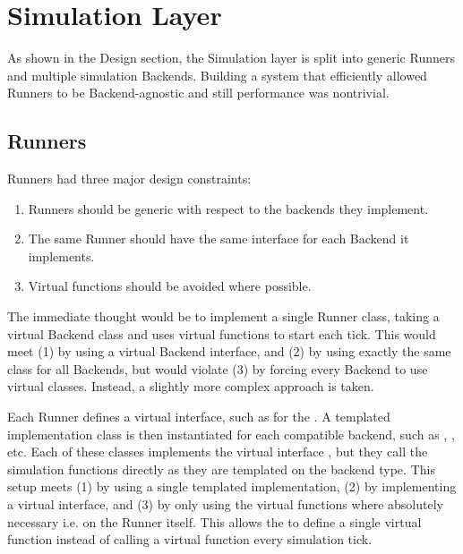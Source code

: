 \section{Simulation Layer}
As shown in the Design section, the Simulation layer is split into generic Runners and multiple simulation Backends.
Building a system that efficiently allowed Runners to be Backend-agnostic and still performance was nontrivial.

\subsection{Runners}
Runners had three major design constraints:
\begin{enumerate}
    \item Runners should be generic with respect to the backends they implement.
    \item The same Runner should have the same interface for each Backend it implements.
    \item Virtual functions should be avoided where possible.
\end{enumerate}
The immediate thought would be to implement a single Runner class, taking a virtual Backend class and uses virtual functions to start each tick.
This would meet (1) by using a virtual Backend interface, and (2) by using exactly the same class for all Backends, but would violate (3) by forcing every Backend to use virtual classes.
Instead, a slightly more complex approach is taken.

Each Runner defines a virtual interface, such as  for the .
A templated implementation class is then instantiated for each compatible backend, such as , , etc.
Each of these classes implements the virtual interface , but they call the simulation functions directly as they are templated on the backend type.
This setup meets (1) by using a single templated implementation, (2) by implementing a virtual interface, and (3) by only using the virtual functions where absolutely necessary i.e. on the Runner itself.
This allows the  to define a single virtual function  instead of calling a virtual function every simulation tick.


